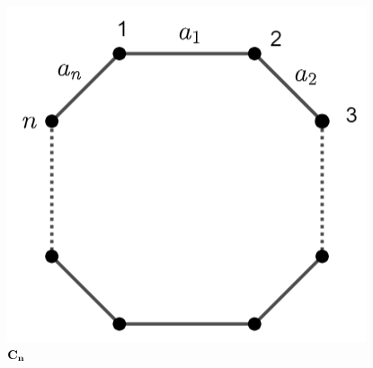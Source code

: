 \begin{figure}[H]
    \centering
    \includegraphics[width=0.35\linewidth]{pictures/Cn.png}
    \caption{${\bf C_n}$}
    \label{Cn:image}
\end{figure}